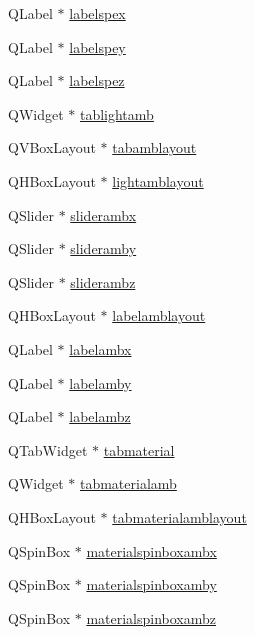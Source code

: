 \begin{DoxyCompactItemize}
\item 
Q\+Label $\ast$ \hyperlink{class_mondock_a9dcd6eacb52a58adddd1f0118dc7fc66}{labelspex}
\item 
Q\+Label $\ast$ \hyperlink{class_mondock_a51f3374b36482300513cfaa0d9e7cb44}{labelspey}
\item 
Q\+Label $\ast$ \hyperlink{class_mondock_af00a5126b8b2d537b5a46064b4d26d76}{labelspez}
\item 
Q\+Widget $\ast$ \hyperlink{class_mondock_a9033d2049c8fcdc628ef06ea8cb192ca}{tablightamb}
\item 
Q\+V\+Box\+Layout $\ast$ \hyperlink{class_mondock_a73f30ee1b770ddf08cdb854136ab4e51}{tabamblayout}
\item 
Q\+H\+Box\+Layout $\ast$ \hyperlink{class_mondock_ada46a57b4e681dc6f9420ae74f46fefc}{lightamblayout}
\item 
Q\+Slider $\ast$ \hyperlink{class_mondock_a51c280e3a1dae1f368e9028069afb424}{sliderambx}
\item 
Q\+Slider $\ast$ \hyperlink{class_mondock_ac6a5fbe64fd9a0567ae84e9ec5244fbd}{slideramby}
\item 
Q\+Slider $\ast$ \hyperlink{class_mondock_aa90503d09eeebd2f51e15a416c6424c7}{sliderambz}
\item 
Q\+H\+Box\+Layout $\ast$ \hyperlink{class_mondock_a8726f8f74256a666684740d03747ad5a}{labelamblayout}
\item 
Q\+Label $\ast$ \hyperlink{class_mondock_af77614bc15448c7488db1b12a03162f5}{labelambx}
\item 
Q\+Label $\ast$ \hyperlink{class_mondock_a467e81ae77fc44ddd9785214c64ae443}{labelamby}
\item 
Q\+Label $\ast$ \hyperlink{class_mondock_a59965e3362191562ca427aaafbffb67f}{labelambz}
\item 
Q\+Tab\+Widget $\ast$ \hyperlink{class_mondock_a85429c5714bc04dc5866983a9659f723}{tabmaterial}
\item 
Q\+Widget $\ast$ \hyperlink{class_mondock_a5b0d6245de8e0e70d7552ad035295793}{tabmaterialamb}
\item 
Q\+H\+Box\+Layout $\ast$ \hyperlink{class_mondock_a768206ca1e41a57f687e6bbbdaca3a9a}{tabmaterialamblayout}
\item 
Q\+Spin\+Box $\ast$ \hyperlink{class_mondock_a4efb6643d3bea5ac601770ed2e3b3290}{materialspinboxambx}
\item 
Q\+Spin\+Box $\ast$ \hyperlink{class_mondock_a52f12188582ccf1488a2f5f2059ec304}{materialspinboxamby}
\item 
Q\+Spin\+Box $\ast$ \hyperlink{class_mondock_a24725d21ed105e3d2fc2c2360c2581a6}{materialspinboxambz}

\end{DoxyCompactItemize}
